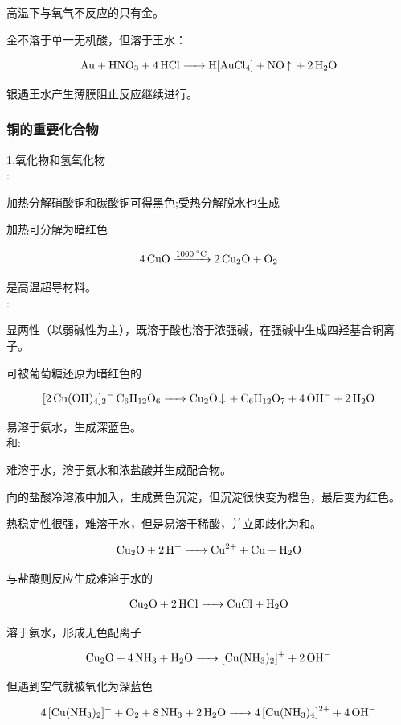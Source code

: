 \documentclass[a4paper,UTF8]{article}
\begin{document}
高温下与氧气不反应的只有金。

金不溶于单一无机酸，但溶于王水：

$$ \ce{Au + HNO3 + 4HCl ->H[AuCl4] + NO\ce{^} + 2H2O} $$

银遇王水产生薄膜阻止反应继续进行。

\subsubsection{铜的重要化合物}
1.氧化物和氢氧化物\\

:

加热分解硝酸铜和碳酸铜可得黑色;受热分解脱水也生成

加热可分解为暗红色

$$ \ce{4CuO ->[1000^\circ C] 2Cu2O + O2} $$

是高温超导材料。\\

:

显两性（以弱碱性为主），既溶于酸也溶于浓强碱，在强碱中生成四羟基合铜离子。

可被葡萄糖还原为暗红色的

$$ \ce{[2Cu(OH)4]2- C6H12O6 -> Cu2O\ce{v} + C6H12O7 + 4OH- + 2H2O} $$

易溶于氨水，生成深蓝色。\\

和:

难溶于水，溶于氨水和浓盐酸并生成配合物。

向的盐酸冷溶液中加入，生成黄色沉淀，但沉淀很快变为橙色，最后变为红色。

热稳定性很强，难溶于水，但是易溶于稀酸，并立即歧化为和。

$$ \ce{Cu2O + 2H+ -> Cu^{2+} + Cu + H2O} $$

与盐酸则反应生成难溶于水的

$$ \ce{Cu2O + 2HCl -> CuCl + H2O} $$

溶于氨水，形成无色配离子\ce{[Cu(NH3)2]^{+}}

$$ \ce{Cu2O + 4NH3 + H2O -> [Cu(NH3)2]^{+} + 2OH-} $$

但\ce{[Cu(NH3)2]^{+}}遇到空气就被氧化为深蓝色

$$ \ce{4[Cu(NH3)2]^{+} + O2 + 8NH3 + 2H2O -> 4[Cu(NH3)4]^{2+} + 4OH-} $$\\
\end{document}
